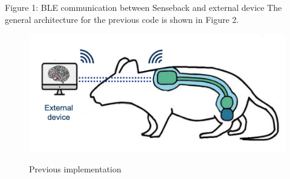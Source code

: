 \documentclass{Configuration_Files/PoliMi3i_thesis}
\begin{document}
Figure 1: BLE communication between Senseback and external device
The general architecture for the previous code is shown in Figure 2.

\begin{figure}[H]
	\includegraphics[scale=0.3]{prev2.png}
	\centering
    \label{prev_2}
    \caption{Previous implementation}
\end{figure}
\end{document}
